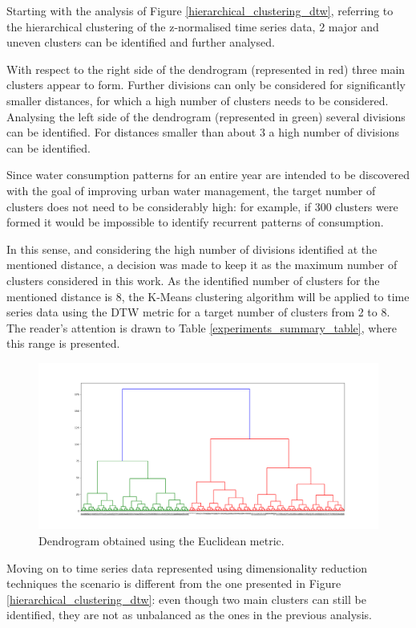 \documentclass[9pt,journal,compsoc]{IEEEtran}
\begin{document}
Starting with the analysis of Figure \ref{hierarchical_clustering_dtw}, referring to the hierarchical clustering of the z-normalised time series data, 2 major and uneven clusters can be identified and further analysed.

With respect to the right side of the dendrogram (represented in red) three main clusters appear to form. Further divisions can only be considered for significantly smaller distances, for which a high number of clusters needs to be considered. Analysing the left side of the dendrogram (represented in green) several divisions can be identified. For distances smaller than about 3 a high number of divisions can be identified.

Since water consumption patterns for an entire year are intended to be discovered with the goal of improving urban water management, the target number of clusters does not need to be considerably high: for example, if 300 clusters were formed it would be impossible to identify recurrent patterns of consumption.

In this sense, and considering the high number of divisions identified at the mentioned distance, a decision was made to keep it as the maximum number of clusters considered in this work. As the identified number of clusters for the mentioned distance is 8, the K-Means clustering algorithm will be applied to time series data using the DTW metric for a target number of clusters from 2 to 8. The reader's attention is drawn to Table \ref{experiments_summary_table}, where this range is presented.

\begin{figure}[ht]
	\centering
	\includegraphics[scale=0.18]{images/Hierarchical_Clustering_Euclidean.png}
	\caption{Dendrogram obtained using the Euclidean metric.}
	\label{hierarchical_clustering_euclidean}
\end{figure}

Moving on to time series data represented using dimensionality reduction techniques the scenario is different from the one presented in Figure \ref{hierarchical_clustering_dtw}: even though two main clusters can still be identified, they are not as unbalanced as the ones in the previous analysis.
\end{document}
